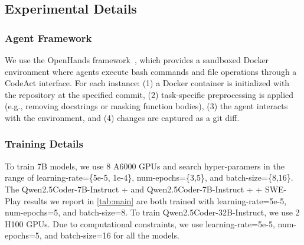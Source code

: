 \documentclass{article}
\theoremstyle{plain}
\theoremstyle{definition}
\theoremstyle{remark}
\begin{document}
\begin{table}[t]
\centering
{}
\caption{The average number of OpenHands tools called in each trajectory.}
\label{tab:openhands-tool-distribution}
\end{table}


\subsection{Experimental Details}
\label{app:exp-details}

\subsubsection{Agent Framework}
We use the OpenHands framework~\cite{openhands}, which provides a sandboxed Docker environment where agents execute bash commands and file operations through a CodeAct interface. For each instance: (1) a Docker container is initialized with the repository at the specified commit, (2) task-specific preprocessing is applied (e.g., removing docstrings or masking function bodies), (3) the agent interacts with the environment, and (4) changes are captured as a git diff.


\subsubsection{Training Details}
To train 7B models, we use 8 A6000 GPUs and search hyper-paramers in the range of learning-rate=\{5e-5, 1e-4\}, num-epochs=\{3,5\}, and batch-size=\{8,16\}.
The Qwen2.5Coder-7B-Instruct + \methodName and Qwen2.5Coder-7B-Instruct + \methodName + SWE-Play results we report in \autoref{tab:main} are both trained with learning-rate=5e-5, num-epochs=5, and batch-size=8.
To train Qwen2.5Coder-32B-Instruct, we use 2 H100 GPUs. Due to computational constraints, we use learning-rate=5e-5, num-epochs=5, and batch-size=16 for all the models.
\end{document}
